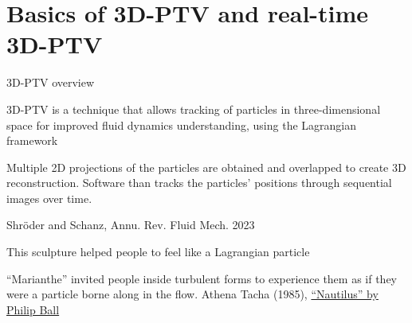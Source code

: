 \section{Basics of 3D-PTV and real-time 3D-PTV}


    

\begin{frame}[label=ptv-1]{3D-PTV overview}
    \begin{multicols}{2}
    \begin{card}
    3D-PTV is a technique that allows tracking of particles in three-dimensional space for improved fluid dynamics understanding, using the Lagrangian framework
    \end{card}
    \begin{card}[TL;DR]
    Multiple 2D projections of the particles are obtained and overlapped to create 3D reconstruction. Software than tracks the particles' positions through sequential images over time. 
    \end{card}
    \end{multicols}
\end{frame}


%
\begin{frame}[label=ptv-2]{Shr\"{o}der and Schanz, Annu. Rev. Fluid Mech. 2023}
\end{frame}

\begin{frame}[label=ptv-3]{This sculpture helped people to feel like a Lagrangian particle}
    \centering{}
    \vspace{-.3cm}
    \begin{cardTiny}
    ``Marianthe'' invited people inside turbulent forms to experience them as
    if they were a particle borne along in the flow. Athena
    Tacha (1985), \href{http://nautil.us/issue/15/turbulence/the-scientific-problem-that-must-be-experienced}{``Nautilus'' by Philip Ball}
    \end{cardTiny}                                                          
\end{frame}
%

